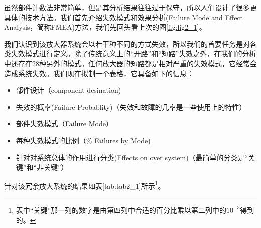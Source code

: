 \documentclass[cn,11pt,chinese]{elegantbook}
\begin{document}
虽然部件计数法非常简单，但是其分析结果往往过于保守，所以人们设计了很多更具体的技术方法。我们首先介绍失效模式和效果分析(Failure Mode and Effect Analysis，简称FMEA)方法，我们先回头看上次的图\ref*{fig:fig2_1}。

我们认识到该放大器系统会以若干种不同的方式失效，所以我们的首要任务是对各类失效模式进行定义。除了传统意义上的“开路”和“短路”失效之外，在我们的分析中还存在28种另外的模式。任何放大器的短路都是相对严重的失效模式，它经常会造成系统失效。我们现在拟制一个表格，它具备如下的信息：
\begin{itemize}
	\item 部件设计（component desination)
	\item 失效的概率(Failure Probablity)（失效和故障的几率是一些使用上的特性）
	\item 部件失效模式（Failure Mode）
	\item 每种失效模式的比例（$\%$ Failures by Mode)
	\item  针对对系统总体的作用进行分类(Effects on over system)（最简单的分类是“关键”和“非关键”）
\end{itemize}


针对该冗余放大系统的结果如表\ref{tab:tab2_1}所示\footnote{表中“关键”那一列的数字是由第四列中合适的百分比乘以第二列中的$10^{-3}$得到的。}。
\end{document}
